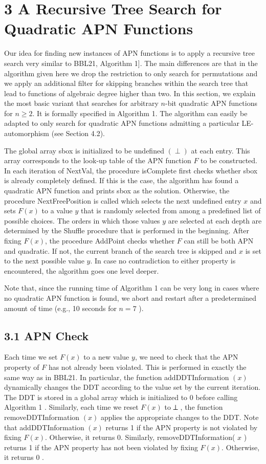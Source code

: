 \documentclass[10pt]{article}
\begin{document}
\section*{3 A Recursive Tree Search for Quadratic APN Functions}
Our idea for finding new instances of APN functions is to apply a recursive tree search very similar to BBL21, Algorithm 1]. The main differences are that in the algorithm given here we drop the restriction to only search for permutations and we apply an additional filter for skipping branches within the search tree that lead to functions of algebraic degree higher than two. In this section, we explain the most basic variant that searches for arbitrary $n$-bit quadratic APN functions for $n \geq 2$. It is formally specified in Algorithm 1. The algorithm can easily be adapted to only search for quadratic APN functions admitting a particular LE-automorphism (see Section 4.2).

The global array sbox is initialized to be undefined $(\perp)$ at each entry. This array corresponds to the look-up table of the APN function $F$ to be constructed. In each iteration of NextVal, the procedure isComplete first checks whether sbox is already completely defined. If this is the case, the algorithm has found a quadratic APN function and prints sbox as the solution. Otherwise, the procedure NextFreePosition is called which selects the next undefined entry $x$ and sets $F(x)$ to a value $y$ that is randomly selected from among a predefined list of possible choices. The orders in which those values $y$ are selected at each depth are determined by the Shuffle procedure that is performed in the beginning. After fixing $F(x)$, the procedure AddPoint checks whether $F$ can still be both APN and quadratic. If not, the current branch of the search tree is skipped and $x$ is set to the next possible value $y$. In case no contradiction to either property is encountered, the algorithm goes one level deeper.

Note that, since the running time of Algorithm 1 can be very long in cases where no quadratic APN function is found, we abort and restart after a predetermined amount of time (e.g., 10 seconds for $n=7$ ).

\subsection*{3.1 APN Check}
Each time we set $F(x)$ to a new value $y$, we need to check that the APN property of $F$ has not already been violated. This is performed in exactly the same way as in BBL21. In particular, the function addDDTInformation $(x)$ dynamically changes the DDT according to the value set by the current iteration. The DDT is stored in a global array which is initialized to 0 before calling Algorithm 1 . Similarly, each time we reset $F(x)$ to ⟂ , the function removeDDTInformation $(x)$ applies the appropriate changes to the DDT. Note that addDDTInformation $(x)$ returns 1 if the APN property is not violated by fixing $F(x)$. Otherwise, it returns 0. Similarly, removeDDTInformation( $x$ ) returns 1 if the APN property has not been violated by fixing $F(x)$. Otherwise, it returns 0 .
\end{document}
